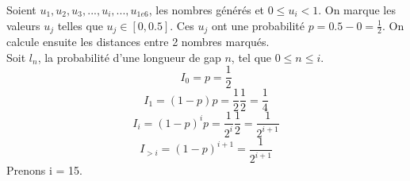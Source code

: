 \documentclass[10pt,a4paper]{article}
\begin{document}
Soient $u_1, u_2, u_3, ..., u_i, ..., u_{1e6}$, les nombres générés et $0 \leq u_i < 1$. On marque les valeurs $u_j$ telles que $u_j \in [0, 0.5]$. Ces $u_j$ ont une probabilité $p = 0.5 - 0 = \frac{1}{2}$. On calcule ensuite les distances entre 2 nombres marqués.\\ Soit $l_n$, la probabilité d'une longueur de gap $n$, tel que $0 \leq n \leq i$.
\[I_0 = p = \frac{1}{2}\]
\[I_1 = (1 - p)p = \frac{1}{2} \frac{1}{2} = \frac{1}{4}\]
\[I_i = (1 - p)^ip = \frac{1}{2^i}\frac{1}{2} = \frac{1}{2^{i+1}}\]
\[I_{>i} = (1 - p)^{i + 1} = \frac{1}{2^{i+1}}\]
Prenons i = 15.\\

\end{document}
